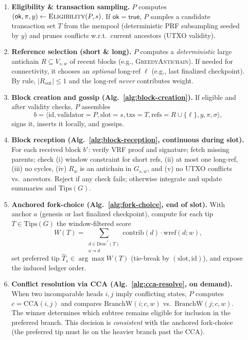 \documentclass[11pt]{article}
\newcommand{\id}{\ensuremath{\mathrm{id}}\xspace}
\newcommand{\val}{\ensuremath{\mathrm{validator}}\xspace}
\newcommand{\slot}{\ensuremath{\mathrm{slot}}\xspace}
\newcommand{\txs}{\ensuremath{\mathrm{txs}}\xspace}
\newcommand{\refs}{\ensuremath{\mathrm{refs}}\xspace}
\newcommand{\Desc}{\ensuremath{\mathrm{Desc}}\xspace}
\newcommand{\Tips}{\ensuremath{\mathrm{Tips}}\xspace}
\newcommand{\Eligibility}{\ensuremath{\textsc{Eligibility}}\xspace}
\newcommand{\GreedyAntichain}{\textsc{GreedyAntichain}\xspace}
\newcommand{\wref}{\ensuremath{\mathrm{wref}}\xspace}
\newcommand{\BranchW}{\ensuremath{\mathrm{BranchW}}\xspace}
\newcommand{\CCA}{\ensuremath{\mathrm{CCA}}\xspace}
\begin{document}
\begin{enumerate}
  \item \textbf{Eligibility \& transaction sampling.}
  $P$ computes $(\mathsf{ok},\pi,y)\leftarrow\Eligibility(P,s)$. If $\mathsf{ok}=\textsf{true}$, $P$ samples a candidate transaction set $T$ from the mempool (deterministic PRF subsampling seeded by $y$) and prunes conflicts w.r.t.\ current ancestors (UTXO validity).

  \item \textbf{Reference selection (short \& long).}
  $P$ computes a \emph{deterministic} large antichain $R\subseteq V_{s,w}$ of recent blocks (e.g., \GreedyAntichain). If needed for connectivity, it chooses an \emph{optional} long-ref $\ell$ (e.g., last finalized checkpoint). By rule, $|R_{\text{out}}|\le1$ and the long-ref \emph{never} contributes weight.

  \item \textbf{Block creation and gossip (Alg.~\ref{alg:block-creation}).}
  If eligible and after validity checks, $P$ assembles
  \[
  b=\langle 
\id,\val{=}P,\slot{=}s,\txs{=}T,\refs{=}R\cup\{\ell\},y,\pi,\sigma\rangle,
  \]
  signs it, inserts it locally, and gossips.

  \item \textbf{Block reception (Alg.~\ref{alg:block-reception}, continuous during slot).}
  For each received block $b'$: verify VRF proof and signature; fetch missing parents; check (i) window constraint for short refs, (ii) at most one long-ref, (iii) no cycles, (iv) $R_w$ is an antichain in $G_{s,w}$, and (v) no UTXO conflicts vs.\ ancestors. Reject if any check fails; otherwise integrate and update summaries and $\Tips(G)$.

  \item \textbf{Anchored fork-choice (Alg.~\ref{alg:fork-choice}, end of slot).}
  With anchor $a$ (genesis or last finalized checkpoint), compute for each tip $T\in\Tips(G)$ the window-filtered score
  \[
  W(T)=\sum_{\substack{d\in\Desc^*(T)\\a\leadsto d}}\mathrm{contrib}(d)\cdot \wref(d;w),
  \]
  set preferred tip $\hat T_s\in\arg\max W(T)$ (tie-break by $(\slot,\id)$), and expose the induced ledger order.

  \item \textbf{Conflict resolution via CCA (Alg.~\ref{alg:cca-resolve}, on demand).}
  When two incomparable heads $i,j$ imply conflicting states, $P$ computes $c=\CCA(i,j)$ and compares $\BranchW(i;c,w)$ vs.\ $\BranchW(j;c,w)$. The winner determines which subtree remains eligible for inclusion in the preferred branch. This decision is \emph{consistent} with the anchored fork-choice (the preferred tip must lie on the heavier branch past the CCA).
\end{enumerate}
\end{document}
